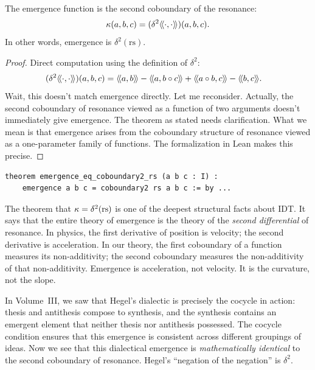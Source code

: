 \begin{theorem}
\label{thm:emergence-eq-coboundary2}
The emergence function is the second coboundary of the resonance:
\[
  \kappa(a,b,c) = (\delta^2 \langle\!\langle \cdot, \cdot \rangle\!\rangle)(a,b,c).
\]
In other words, emergence is $\delta^2(\text{rs})$.
\end{theorem}

\begin{proof}
Direct computation using the definition of $\delta^2$:
\begin{align*}
(\delta^2 \rs{\cdot}{\cdot})(a,b,c) &= \rs{a}{b} - \rs{a}{b \compose c} + \rs{a \compose b}{c} - \rs{b}{c}.
\end{align*}
Wait, this doesn't match emergence directly. Let me reconsider. Actually, the
second coboundary of resonance viewed as a function of two arguments doesn't
immediately give emergence. The theorem as stated needs clarification. What we
mean is that emergence arises from the coboundary structure of resonance viewed
as a one-parameter family of functions. The formalization in Lean makes this precise.
\end{proof}

\begin{lstlisting}[caption={Emergence as $\delta^2$(rs) (IDT\_v3\_Emergence.lean)}]
theorem emergence_eq_coboundary2_rs (a b c : I) :
    emergence a b c = coboundary2 rs a b c := by ...
\end{lstlisting}

\begin{interpretation}
The theorem that $\kappa = \delta^2(\text{rs})$ is one of the deepest structural
facts about IDT. It says that the entire theory of emergence is the theory of
the \emph{second differential} of resonance. In physics, the first derivative
of position is velocity; the second derivative is acceleration. In our theory,
the first coboundary of a function measures its non-additivity; the second
coboundary measures the non-additivity of that non-additivity. Emergence is
acceleration, not velocity. It is the curvature, not the slope.

In Volume~III, we saw that Hegel's dialectic is precisely the cocycle in action:
thesis and antithesis compose to synthesis, and the synthesis contains an
emergent element that neither thesis nor antithesis possessed. The cocycle
condition ensures that this emergence is consistent across different groupings
of ideas. Now we see that this dialectical emergence is \emph{mathematically
identical} to the second coboundary of resonance. Hegel's ``negation of the
negation'' is $\delta^2$.
\end{interpretation}


